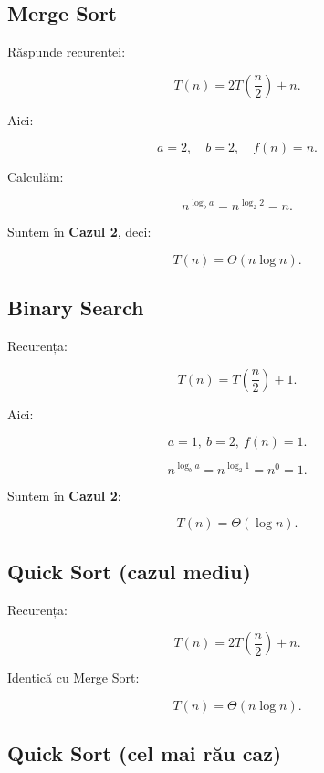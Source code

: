 \documentclass[12pt]{article}
\begin{document}
\subsection{Merge Sort}

Răspunde recurenței:


\[
T(n) = 2T\left(\frac{n}{2}\right) + n.
\]



Aici:


\[
a = 2,\quad b = 2,\quad f(n) = n.
\]



Calculăm:


\[
n^{\log_b a} = n^{\log_2 2} = n.
\]



Suntem în \textbf{Cazul 2}, deci:


\[
T(n) = \Theta(n \log n).
\]



\subsection{Binary Search}

Recurența:


\[
T(n) = T\left(\frac{n}{2}\right) + 1.
\]



Aici:


\[
a = 1,\ b = 2,\ f(n) = 1.
\]





\[
n^{\log_b a} = n^{\log_2 1} = n^0 = 1.
\]



Suntem în \textbf{Cazul 2}:


\[
T(n) = \Theta(\log n).
\]



\subsection{Quick Sort (cazul mediu)}

Recurența:


\[
T(n) = 2T\left(\frac{n}{2}\right) + n.
\]



Identică cu Merge Sort:


\[
T(n) = \Theta(n \log n).
\]



\subsection{Quick Sort (cel mai rău caz)}
\end{document}
